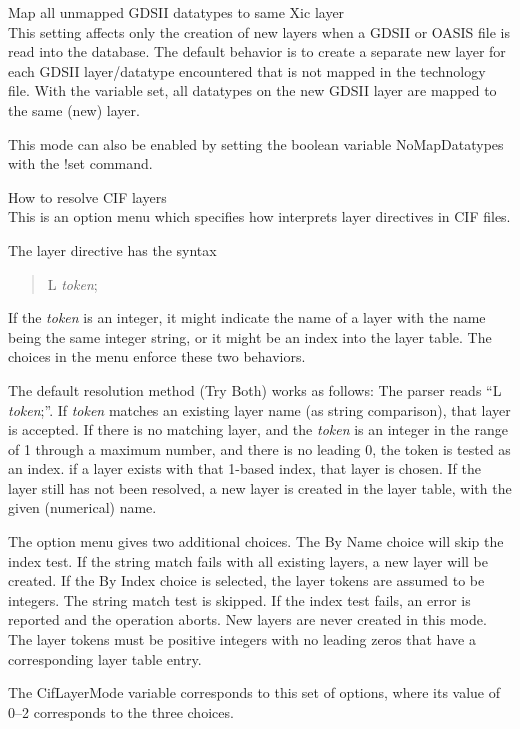 \begin{description}
\item{\cb Map all unmapped GDSII datatypes to same Xic layer}\\
This setting affects only the creation of new layers when a GDSII or
OASIS file is read into the database.  The default behavior is to
create a separate new {\Xic} layer for each GDSII layer/datatype
encountered that is not mapped in the technology file.  With the
variable set, all datatypes on the new GDSII layer are mapped to the
same (new) {\Xic} layer.

This mode can also be enabled by setting the boolean variable {\et
NoMapDatatypes} with the {\cb !set} command.

\item{\cb How to resolve CIF layers}\\
This is an option menu which specifies how {\Xic} interprets layer
directives in CIF files.

The layer directive has the syntax
\begin{quote}
{\vt L} {\it token}{\vt ;}
\end{quote}

If the {\it token} is an integer, it might indicate the name of a
layer with the name being the same integer string, or it might be an
index into the layer table.  The choices in the menu enforce these two
behaviors.

The default resolution method ({\cb Try Both}) works as follows:  The
parser reads ``{\vt L} {\it token}{\vt ;}''.  If {\it token} matches
an existing layer name (as string comparison), that layer is accepted. 
If there is no matching layer, and the {\it token} is an integer in
the range of 1 through a maximum number, and there is no leading 0,
the token is tested as an index.  if a layer exists with that 1-based
index, that layer is chosen.  If the layer still has not been
resolved, a new layer is created in the layer table, with the given
(numerical) name.

The option menu gives two additional choices.  The {\cb By Name}
choice will skip the index test.  If the string match fails with all
existing layers, a new layer will be created.  If the {\cb By Index}
choice is selected, the layer tokens are assumed to be integers.  The
string match test is skipped.  If the index test fails, an error is
reported and the operation aborts.  New layers are never created in
this mode.  The layer tokens must be positive integers with no leading
zeros that have a corresponding layer table entry.

The {\et CifLayerMode} variable corresponds to this set of options,
where its value of 0--2 corresponds to the three choices.


\end{description}
